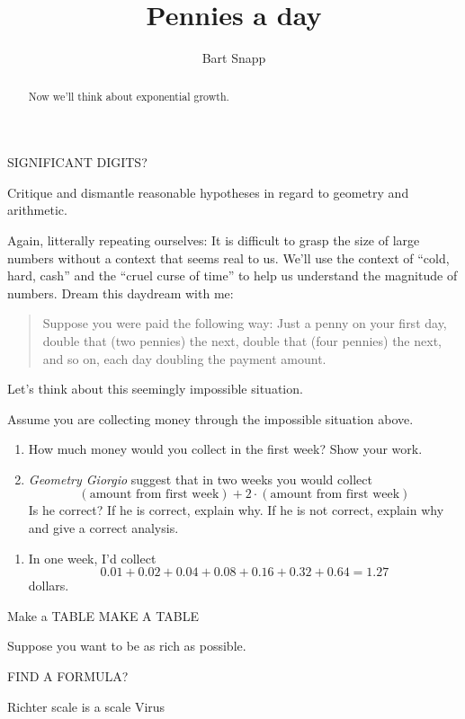 \documentclass[nooutcomes,noauthor,hints]{ximera}
\title{Pennies a day}
\author{Bart Snapp}
\begin{document}
\begin{abstract}
  Now we'll think about exponential growth.
\end{abstract}
\maketitle

\begin{listOutcomes}
\item SIGNIFICANT DIGITS?
\item Critique and dismantle reasonable hypotheses in regard to
  geometry and arithmetic.
\end{listOutcomes}


Again, litterally repeating ourselves: It is difficult to grasp the
size of large numbers without a context that seems real to us. We'll
use the context of ``cold, hard, cash'' and the ``cruel curse of
time'' to help us understand the magnitude of numbers.  Dream this
daydream with me:
\begin{quote}
  Suppose you were paid the following way: Just a penny on your first
  day, double that (two pennies) the next, double that (four pennies)
  the next, and so on, each day doubling the payment amount.
\end{quote}

Let's think about this seemingly impossible situation.



\mynewpage


\begin{question}
  Assume you are collecting money through the impossible situation
  above.
  \begin{enumerate}
  \item How much money would you collect in the first week? Show your
    work.
  \item \textit{Geometry Giorgio} suggest that in two weeks you would
    collect
    \[
    (\text{amount from first week}) + 2\cdot (\text{amount from first
      week})
    \]
    Is he correct? If he is correct, explain why. If he is not
    correct, explain why and give a correct analysis.
  \end{enumerate}
  \begin{freeResponse}
    \begin{enumerate}
    \item In one week, I'd collect
      \[
      0.01+0.02+0.04+0.08+0.16+0.32+0.64 = 1.27
      \]
      dollars.
    \end{enumerate}
  \end{freeResponse}
\end{question}
\mynewpage







\begin{question}
  Make a TABLE 
  MAKE A TABLE
  
  Suppose you want to be as rich as possible.
\end{question}
\mynewpage


\begin{question}
  FIND A FORMULA?
  
  Richter scale is a scale
  Virus
  
\end{question}
\end{document}
